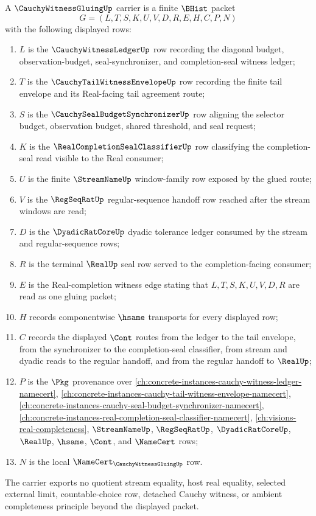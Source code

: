 \begin{definition}
\label{def:cauchy-witness-gluing-carrier}
A $\CauchyWitnessGluingUp$ carrier is a finite $\BHist$ packet
$$
G=(L,T,S,K,U,V,D,R,E,H,C,P,N)
$$
with the following displayed rows:
\begin{enumerate}
\item $L$ is the $\CauchyWitnessLedgerUp$ row recording the diagonal budget, observation-budget, seal-synchronizer, and completion-seal witness ledger;
\item $T$ is the $\CauchyTailWitnessEnvelopeUp$ row recording the finite tail envelope and its Real-facing tail agreement route;
\item $S$ is the $\CauchySealBudgetSynchronizerUp$ row aligning the selector budget, observation budget, shared threshold, and seal request;
\item $K$ is the $\RealCompletionSealClassifierUp$ row classifying the completion-seal read visible to the Real consumer;
\item $U$ is the finite $\StreamNameUp$ window-family row exposed by the glued route;
\item $V$ is the $\RegSeqRatUp$ regular-sequence handoff row reached after the stream windows are read;
\item $D$ is the $\DyadicRatCoreUp$ dyadic tolerance ledger consumed by the stream and regular-sequence rows;
\item $R$ is the terminal $\RealUp$ seal row served to the completion-facing consumer;
\item $E$ is the Real-completion witness edge stating that $L,T,S,K,U,V,D,R$ are read as one gluing packet;
\item $H$ records componentwise $\hsame$ transports for every displayed row;
\item $C$ records the displayed $\Cont$ routes from the ledger to the tail envelope, from the synchronizer to the completion-seal classifier, from stream and dyadic reads to the regular handoff, and from the regular handoff to $\RealUp$;
\item $P$ is the $\Pkg$ provenance over \autoref{ch:concrete-instances-cauchy-witness-ledger-namecert}, \autoref{ch:concrete-instances-cauchy-tail-witness-envelope-namecert}, \autoref{ch:concrete-instances-cauchy-seal-budget-synchronizer-namecert}, \autoref{ch:concrete-instances-real-completion-seal-classifier-namecert}, \autoref{ch:visions-real-completeness}, $\StreamNameUp$, $\RegSeqRatUp$, $\DyadicRatCoreUp$, $\RealUp$, $\hsame$, $\Cont$, and $\NameCert$ rows;
\item $N$ is the local $\NameCert_{\CauchyWitnessGluingUp}$ row.
\end{enumerate}
The carrier exports no quotient stream equality, host real equality, selected external limit, countable-choice row, detached Cauchy witness, or ambient completeness principle beyond the displayed packet.
\end{definition}

